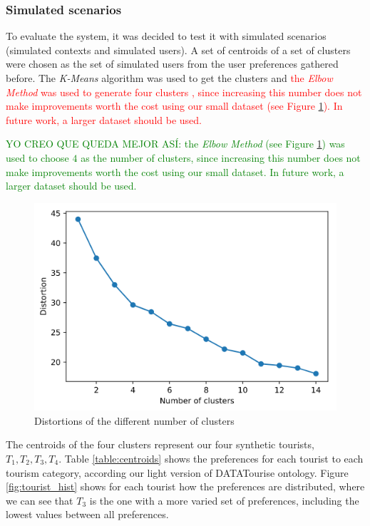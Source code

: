 \subsubsection{Simulated scenarios}
To evaluate the system, it was decided to test it with simulated scenarios (simulated contexts and simulated users). A set of centroids of a set of clusters were chosen as the set of simulated users from the user preferences gathered before. The \textit{K-Means} algorithm was used to get the clusters and \textcolor{red}{the \textit{Elbow Method} was used to generate four clusters , since increasing this number does not make improvements worth the cost using our small dataset (see Figure \ref{fig:elbow}). In future work, a larger dataset should be used.}

\textcolor{green}{YO CREO QUE QUEDA MEJOR ASÍ: the \textit{Elbow Method} (see Figure \ref{fig:elbow}) was used to choose $4$ as the number of clusters, since increasing this number does not make improvements worth the cost using our small dataset. In future work, a larger dataset should be used.}

\begin{figure}[h]
    \centering
    \includegraphics[scale=0.45]{elbow.png}
    \caption{Distortions of the different number of clusters}
    \label{fig:elbow}
\end{figure}

The centroids of the four clusters represent our four synthetic tourists, $T_1, T_2, T_3, T_4$. Table \ref{table:centroids} shows the preferences for each tourist to each tourism category, according our light version of DATATourise ontology.  Figure \ref{fig:tourist_hist} shows for each tourist how the preferences are distributed, where we can see that $T_3$ is the one with a more varied set of preferences, including the lowest values between all preferences.

